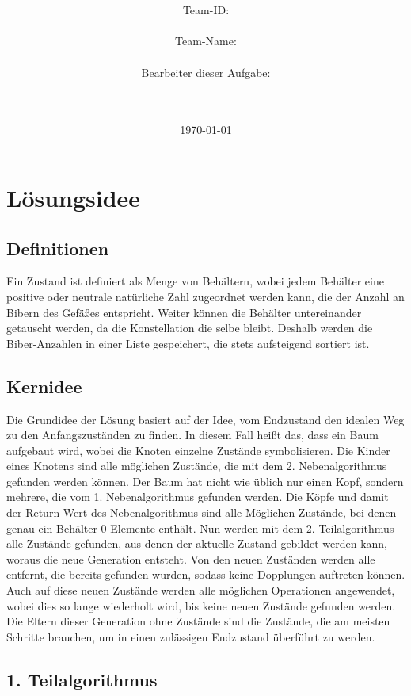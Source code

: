 \documentclass[a4paper,10pt,ngerman]{scrartcl}
\title{\textbf{\Huge\Aufgabe}}
\author{\LARGE Team-ID: \LARGE \TeamID \\\\
	    \LARGE Team-Name: \LARGE \TeamName \\\\
	    \LARGE Bearbeiter dieser Aufgabe: \\ 
	    \LARGE \Namen\\\\}
\date{\LARGE\today}
\begin{document}
\maketitle
\tableofcontents

\vspace{0.5cm}

\section{Lösungsidee}
\subsection{Definitionen}
Ein Zustand ist definiert als Menge von Behältern, wobei jedem Behälter eine positive oder neutrale natürliche Zahl zugeordnet werden kann, die der Anzahl an Bibern des Gefäßes entspricht. Weiter können die Behälter untereinander getauscht werden, da die Konstellation die selbe bleibt. Deshalb werden die Biber-Anzahlen in einer Liste gespeichert, die stets aufsteigend sortiert ist.
\subsection{Kernidee}
Die Grundidee der Lösung basiert auf der Idee, vom Endzustand den idealen Weg zu den Anfangszuständen zu finden. In diesem Fall heißt das, dass ein Baum  aufgebaut wird, wobei die Knoten einzelne Zustände symbolisieren. Die Kinder eines Knotens sind alle möglichen Zustände, die mit dem 2. Nebenalgorithmus gefunden werden können. Der Baum hat nicht wie üblich nur einen Kopf, sondern mehrere, die vom 1. Nebenalgorithmus gefunden werden. Die Köpfe und damit der Return-Wert des Nebenalgorithmus sind alle Möglichen Zustände, bei denen genau ein Behälter 0 Elemente enthält. Nun werden mit dem 2. Teilalgorithmus alle Zustände gefunden, aus denen der aktuelle Zustand gebildet werden kann, woraus die neue Generation entsteht. Von den neuen Zuständen werden alle entfernt, die bereits gefunden wurden, sodass keine Dopplungen auftreten können. Auch auf diese neuen Zustände werden alle möglichen Operationen angewendet, wobei dies so lange wiederholt wird, bis keine neuen Zustände gefunden werden. Die Eltern dieser Generation ohne Zustände sind die Zustände, die am meisten Schritte brauchen, um in einen zulässigen Endzustand überführt zu werden.
\subsection{1. Teilalgorithmus}
\end{document}
